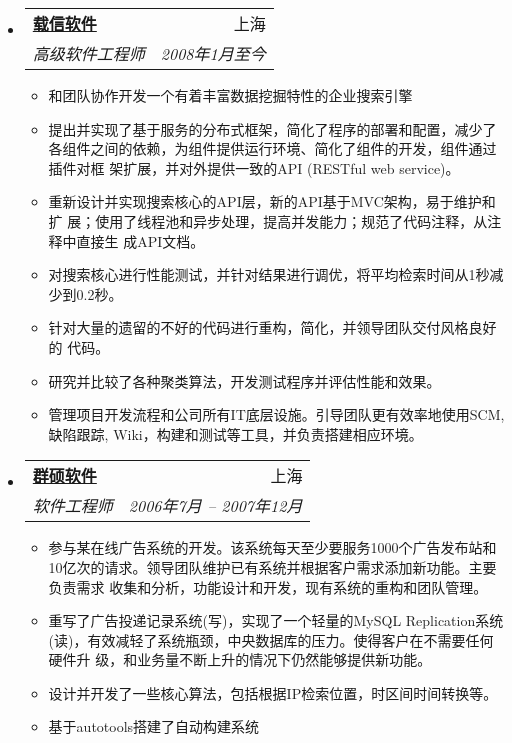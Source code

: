 \documentclass[letterpaper,11pt]{article}
\makeatletter
\newcommand{\resitem}[1]{\item #1 \vspace{-2pt}}
\newcommand{\ressubheading}[4]{
\begin{tabular*}{6.5in}{l@{\extracolsep{\fill}}r}
  \textbf{#1} & #2 \\
  \textit{#3} & \textit{#4} \\
\end{tabular*}\vspace{-6pt}}
\makeatother
\begin{document}
\begin{itemize}
\item
  \ressubheading{\href{http://www.izenesoft.com/EN/home.html}{载信软件}}{上海}{%
    高级软件工程师}{2008年1月至今}

  { \footnotesize
    \begin{itemize}
      \resitem{和团队协作开发一个有着丰富数据挖掘特性的企业搜索引擎}

      \resitem{提出并实现了基于服务的分布式框架，简化了程序的部署和配置，减少了
        各组件之间的依赖，为组件提供运行环境、简化了组件的开发，组件通过插件对框
        架扩展，并对外提供一致的API (RESTful web service)。}

      \resitem{重新设计并实现搜索核心的API层，新的API基于MVC架构，易于维护和扩
        展；使用了线程池和异步处理，提高并发能力；规范了代码注释，从注释中直接生
        成API文档。}

      \resitem{对搜索核心进行性能测试，并针对结果进行调优，将平均检索时间从1秒减
        少到0.2秒。}

      \resitem{针对大量的遗留的不好的代码进行重构，简化，并领导团队交付风格良好的
        代码。}

      \resitem{研究并比较了各种聚类算法，开发测试程序并评估性能和效果。}

      \resitem{管理项目开发流程和公司所有IT底层设施。引导团队更有效率地使用SCM,
        缺陷跟踪, Wiki，构建和测试等工具，并负责搭建相应环境。}

    \end{itemize}
  }

\item \ressubheading{\href{http://www.augmentum.com/}{群硕软件}}{上海}{%
  软件工程师}{2006年7月 -- 2007年12月}

  { \footnotesize
    \begin{itemize}
      \resitem{参与某在线广告系统的开发。该系统每天至少要服务1000个广告发布站和
        10亿次的请求。领导团队维护已有系统并根据客户需求添加新功能。主要负责需求
        收集和分析，功能设计和开发，现有系统的重构和团队管理。}

      \resitem{重写了广告投递记录系统(写)，实现了一个轻量的MySQL Replication系统
        (读)，有效减轻了系统瓶颈，中央数据库的压力。使得客户在不需要任何硬件升
        级，和业务量不断上升的情况下仍然能够提供新功能。}

      \resitem{设计并开发了一些核心算法，包括根据IP检索位置，时区间时间转换等。}

      \resitem{基于autotools搭建了自动构建系统}

    \end{itemize}
  }
\end{itemize}
\end{document}
